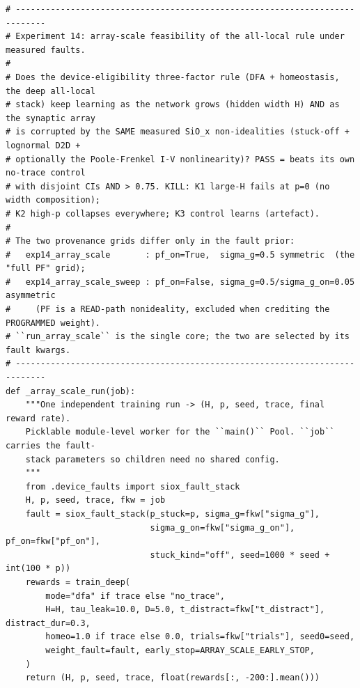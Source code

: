 \begin{lstlisting}[caption={mrl\_trace/deep.py},label={lst:siox-src-deep}]
# ----------------------------------------------------------------------------
# Experiment 14: array-scale feasibility of the all-local rule under measured faults.
#
# Does the device-eligibility three-factor rule (DFA + homeostasis, the deep all-local
# stack) keep learning as the network grows (hidden width H) AND as the synaptic array
# is corrupted by the SAME measured SiO_x non-idealities (stuck-off + lognormal D2D +
# optionally the Poole-Frenkel I-V nonlinearity)? PASS = beats its own no-trace control
# with disjoint CIs AND > 0.75. KILL: K1 large-H fails at p=0 (no width composition);
# K2 high-p collapses everywhere; K3 control learns (artefact).
#
# The two provenance grids differ only in the fault prior:
#   exp14_array_scale       : pf_on=True,  sigma_g=0.5 symmetric  (the "full PF" grid);
#   exp14_array_scale_sweep : pf_on=False, sigma_g=0.5/sigma_g_on=0.05 asymmetric
#     (PF is a READ-path nonideality, excluded when crediting the PROGRAMMED weight).
# ``run_array_scale`` is the single core; the two are selected by its fault kwargs.
# ----------------------------------------------------------------------------
def _array_scale_run(job):
    """One independent training run -> (H, p, seed, trace, final reward rate).
    Picklable module-level worker for the ``main()`` Pool. ``job`` carries the fault-
    stack parameters so children need no shared config.
    """
    from .device_faults import siox_fault_stack
    H, p, seed, trace, fkw = job
    fault = siox_fault_stack(p_stuck=p, sigma_g=fkw["sigma_g"],
                             sigma_g_on=fkw["sigma_g_on"], pf_on=fkw["pf_on"],
                             stuck_kind="off", seed=1000 * seed + int(100 * p))
    rewards = train_deep(
        mode="dfa" if trace else "no_trace",
        H=H, tau_leak=10.0, D=5.0, t_distract=fkw["t_distract"], distract_dur=0.3,
        homeo=1.0 if trace else 0.0, trials=fkw["trials"], seed0=seed,
        weight_fault=fault, early_stop=ARRAY_SCALE_EARLY_STOP,
    )
    return (H, p, seed, trace, float(rewards[:, -200:].mean()))



\end{lstlisting}
